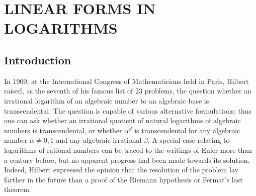 
\chapter{LINEAR FORMS IN LOGARITHMS}\label{ch:2}

\section{Introduction}

In 1900, at the International Congress of Mathematicians held in Paris, Hilbert raised, as the seventh of his famous list of 23 problems, the question whether an irrational logarithm of an algebraic number to an algebraic base is transcendental. The question is capable of various alternative formulations; thus one can ask whether an irrational quotient of natural logarithms of algebraic numbers is transcendental, or whether $\alpha^{\beta}$ is transcendental for any algebraic number $\alpha \neq 0, 1$ and any algebraic irrational $\beta$. A special case relating to logarithms of rational numbers can be traced to the writings of Euler more than a century before, but no apparent progress had been made towards its solution. Indeed, Hilbert expressed the opinion that the resolution of the problem lay farther in the future than a proof of the Riemann hypothesis or Fermat's last theorem.

